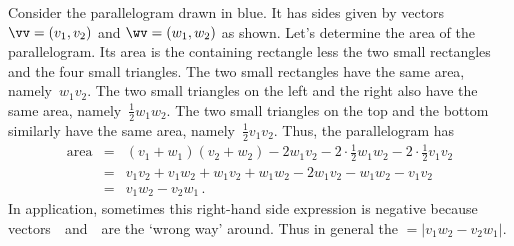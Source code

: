 \begin{wrapfigure}{r}{0pt} 
\end{wrapfigure}
Consider the parallelogram drawn in blue.
It has sides given by vectors \(\vv=(v_1,v_2)\) and \(\wv=(w_1,w_2)\) as shown.
Let's determine the area of the parallelogram. 
Its area is the containing rectangle less the two small rectangles and the four small triangles.
The two small rectangles have the same area, namely~\(w_1v_2\).
The two small triangles on the left and the right also have the same area, namely~\(\frac12w_1w_2\).
The two small triangles on the top and the bottom similarly have the same area, namely~\(\frac12v_1v_2\).
Thus, the parallelogram has 
\begin{eqnarray*}
\text{area}&=&(v_1+w_1)(v_2+w_2)-2w_1v_2-2\cdot\frac12w_1w_2-2\cdot\frac12v_1v_2
\nonumber
\\&=&v_1v_2+v_1w_2+w_1v_2+w_1w_2-2w_1v_2-w_1w_2-v_1v_2
\nonumber
\\&=&v_1w_2-v_2w_1\,. %
\end{eqnarray*}
In application, sometimes this right-hand side expression is negative because vectors~\vv\ and~\wv\ are the `wrong way' around.
Thus in general the \({}=|v_1w_2-v_2w_1|\).



